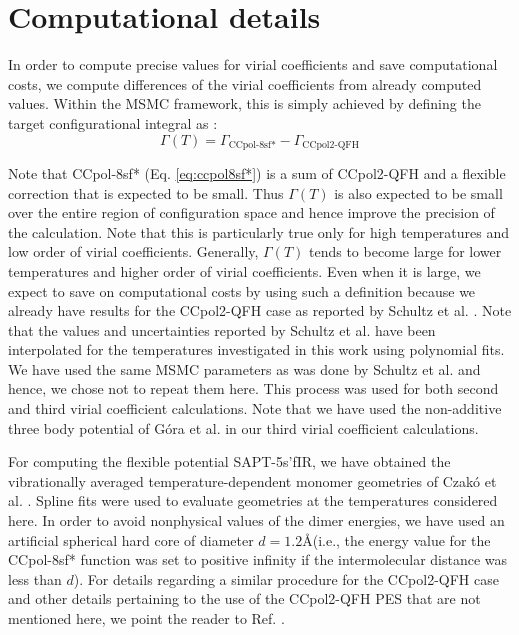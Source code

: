 \section{Computational details}
    \label{sec:computational details}
        In order to compute precise values for virial coefficients and save computational costs, we compute differences of the virial coefficients from already computed values. Within the MSMC framework, this is simply achieved by defining the target configurational integral as \cite{Shaul2012}:
        \begin{equation}
            \Gamma (T) = \Gamma_{\text{CCpol-8sf*}} - \Gamma_{\text{CCpol2-QFH}}
        \end{equation}

        Note that CCpol-8sf* (Eq. \eqref{eq:ccpol8sf*}) is a sum of CCpol2-QFH and a flexible correction that is expected to be small. Thus $\Gamma (T)$ is also expected to be small over the entire region of configuration space and hence improve the precision of the calculation. Note that this is particularly true only for high temperatures and low order of virial coefficients. Generally, $\Gamma (T)$ tends to become large for lower temperatures and higher order of virial coefficients. Even when it is large, we expect to save on computational costs by using such a definition because we already have results for the CCpol2-QFH case as reported by Schultz et al. \cite{Schultz2015}. Note that the values and uncertainties reported by Schultz et al. have been interpolated for the temperatures investigated in this work using polynomial fits. We have used the same MSMC parameters as was done by Schultz et al. and hence, we chose not to repeat them here. This process was used for both second and third virial coefficient calculations. Note that we have used the non-additive three body potential of G\'{o}ra et al. \cite{Gora2014} in our third virial coefficient calculations.

        For computing the flexible potential SAPT-5s'fIR, we have obtained the vibrationally averaged temperature-dependent monomer geometries of Czak\'{o} et al. \cite{Czako2009}. Spline fits were used to evaluate geometries at the temperatures considered here. In order to avoid nonphysical values of the dimer energies, we have used an artificial spherical hard core of diameter $d = 1.2$\AA (i.e., the energy value for the CCpol-8sf* function was set to positive infinity if the intermolecular distance was less than $d$). For details regarding a similar procedure for the CCpol2-QFH case and other details pertaining to the use of the CCpol2-QFH PES that are not mentioned here, we point the reader to Ref. \cite{Schultz2015}. 

